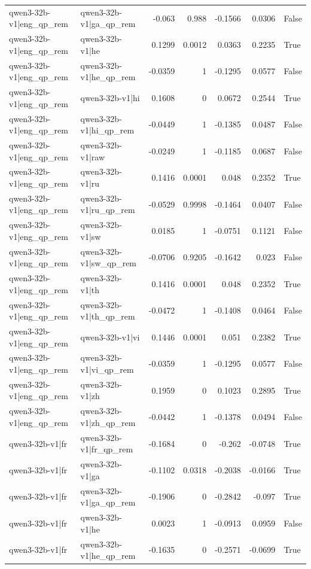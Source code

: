 \begin{table}
\begin{tabular}{l l r r r r l}
qwen3-32b-v1|eng_qp_rem & qwen3-32b-v1|ga_qp_rem & -0.063 & 0.988 & -0.1566 & 0.0306 & False \\
qwen3-32b-v1|eng_qp_rem & qwen3-32b-v1|he & 0.1299 & 0.0012 & 0.0363 & 0.2235 & True \\
qwen3-32b-v1|eng_qp_rem & qwen3-32b-v1|he_qp_rem & -0.0359 & 1 & -0.1295 & 0.0577 & False \\
qwen3-32b-v1|eng_qp_rem & qwen3-32b-v1|hi & 0.1608 & 0 & 0.0672 & 0.2544 & True \\
qwen3-32b-v1|eng_qp_rem & qwen3-32b-v1|hi_qp_rem & -0.0449 & 1 & -0.1385 & 0.0487 & False \\
qwen3-32b-v1|eng_qp_rem & qwen3-32b-v1|raw & -0.0249 & 1 & -0.1185 & 0.0687 & False \\
qwen3-32b-v1|eng_qp_rem & qwen3-32b-v1|ru & 0.1416 & 0.0001 & 0.048 & 0.2352 & True \\
qwen3-32b-v1|eng_qp_rem & qwen3-32b-v1|ru_qp_rem & -0.0529 & 0.9998 & -0.1464 & 0.0407 & False \\
qwen3-32b-v1|eng_qp_rem & qwen3-32b-v1|sw & 0.0185 & 1 & -0.0751 & 0.1121 & False \\
qwen3-32b-v1|eng_qp_rem & qwen3-32b-v1|sw_qp_rem & -0.0706 & 0.9205 & -0.1642 & 0.023 & False \\
qwen3-32b-v1|eng_qp_rem & qwen3-32b-v1|th & 0.1416 & 0.0001 & 0.048 & 0.2352 & True \\
qwen3-32b-v1|eng_qp_rem & qwen3-32b-v1|th_qp_rem & -0.0472 & 1 & -0.1408 & 0.0464 & False \\
qwen3-32b-v1|eng_qp_rem & qwen3-32b-v1|vi & 0.1446 & 0.0001 & 0.051 & 0.2382 & True \\
qwen3-32b-v1|eng_qp_rem & qwen3-32b-v1|vi_qp_rem & -0.0359 & 1 & -0.1295 & 0.0577 & False \\
qwen3-32b-v1|eng_qp_rem & qwen3-32b-v1|zh & 0.1959 & 0 & 0.1023 & 0.2895 & True \\
qwen3-32b-v1|eng_qp_rem & qwen3-32b-v1|zh_qp_rem & -0.0442 & 1 & -0.1378 & 0.0494 & False \\
qwen3-32b-v1|fr & qwen3-32b-v1|fr_qp_rem & -0.1684 & 0 & -0.262 & -0.0748 & True \\
qwen3-32b-v1|fr & qwen3-32b-v1|ga & -0.1102 & 0.0318 & -0.2038 & -0.0166 & True \\
qwen3-32b-v1|fr & qwen3-32b-v1|ga_qp_rem & -0.1906 & 0 & -0.2842 & -0.097 & True \\
qwen3-32b-v1|fr & qwen3-32b-v1|he & 0.0023 & 1 & -0.0913 & 0.0959 & False \\
qwen3-32b-v1|fr & qwen3-32b-v1|he_qp_rem & -0.1635 & 0 & -0.2571 & -0.0699 & True \\

\end{tabular}
\end{table}
